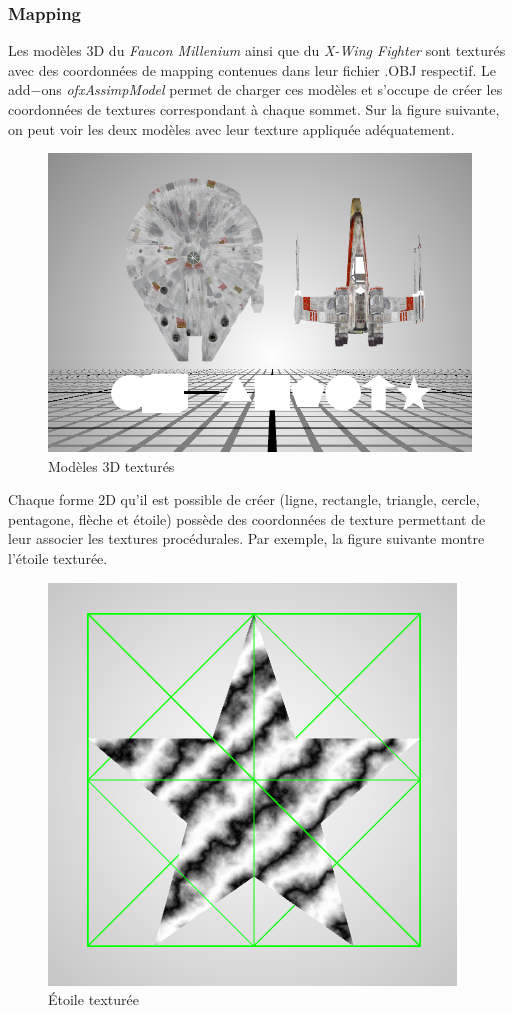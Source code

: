 \subsubsection{Mapping}
Les modèles 3D du \textit{Faucon Millenium} ainsi que du \textit{X-Wing Fighter} sont texturés avec des coordonnées de mapping contenues dans leur fichier .OBJ respectif.
Le add$-$ons \textit{ofxAssimpModel} permet de charger ces modèles et s'occupe de créer les coordonnées de textures correspondant à chaque sommet.
Sur la figure suivante, on peut voir les deux modèles avec leur texture appliquée adéquatement.
\begin{figure}[H]
    \centering
	\includegraphics[scale=0.4]{fig/shapes.PNG}
	\caption{Modèles 3D texturés}
	\label{fig:mapping}
\end{figure}

Chaque forme 2D qu'il est possible de créer (ligne, rectangle, triangle, cercle, pentagone, flèche et étoile) possède des coordonnées de texture permettant de leur associer les textures procédurales.
Par exemple, la figure suivante montre l'étoile texturée.
\begin{figure}[H]
    \centering
	\includegraphics[scale=0.4]{fig/star.PNG}
	\caption{Étoile texturée}
	\label{fig:mapping2}
\end{figure}




